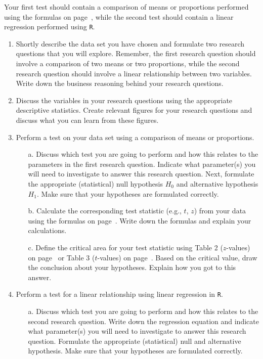 Your first test should contain a comparison of means or proportions performed using the formulas on page~\pageref{formulasheet}, while the second test should contain a linear regression performed using \texttt{R}. \\

\begin{enumerate}
    \item Shortly describe the data set you have chosen and formulate two research questions that you will explore. Remember, the first research question should involve a comparison of two means or two proportions, while the second research question should involve a linear relationship between two variables. Write down the business reasoning behind your research questions. 
    \item Discuss the variables in your research questions using the appropriate descriptive statistics. Create relevant figures for your research questions and discuss what you can learn from these figures. 
    \item Perform a test on your data set using a comparison of means or proportions.
    \begin{enumerate}
        \item[a.] Discuss which test you are going to perform and how this relates to the parameters in the first research question. Indicate what parameter(s) you will need to investigate to answer this research question. Next, formulate the appropriate (statistical) null hypothesis $H_0$ and alternative hypothesis $H_1$. Make sure that your hypotheses are formulated correctly.
        \item[b.] Calculate the corresponding test statistic (e.g., $t$, $z$) from your data using the formulas on page~\pageref{formulasheet}. Write down the formulas and explain your calculations. 
        \item[c.] Define the critical area for your test statistic using Table 2 ($z$-values) on page~\pageref{table2} or Table 3 ($t$-values) on page~\pageref{table3}. Based on the critical value, draw the conclusion about your hypotheses. Explain how you got to this answer.
    \end{enumerate}
    \item Perform a test for a linear relationship using linear regression in \texttt{R}.
    \begin{enumerate}
        \item[a.] Discuss which test you are going to perform and how this relates to the second research question. Write down the regression equation and indicate what parameter(s) you will need to investigate to answer this research question. Formulate the appropriate (statistical) null and alternative hypothesis. Make sure that your hypotheses are formulated correctly.

\end{enumerate}
\end{enumerate}
